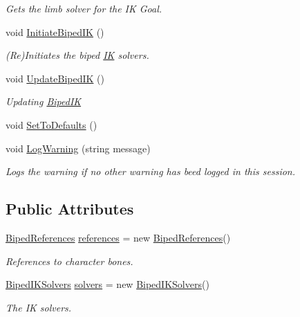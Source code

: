 \begin{DoxyCompactItemize}
\begin{DoxyCompactList}\small\item\em Gets the limb solver for the IK Goal. \end{DoxyCompactList}\item 
void \mbox{\hyperlink{class_root_motion_1_1_final_i_k_1_1_biped_i_k_ac507a1f7a39259bb1620b36534e0ffa2}{Initiate\+Biped\+IK}} ()
\begin{DoxyCompactList}\small\item\em (Re)Initiates the biped \mbox{\hyperlink{class_root_motion_1_1_final_i_k_1_1_i_k}{IK}} solvers. \end{DoxyCompactList}\item 
void \mbox{\hyperlink{class_root_motion_1_1_final_i_k_1_1_biped_i_k_a98cf2065a4b9994d94d6ac4c5a5437bd}{Update\+Biped\+IK}} ()
\begin{DoxyCompactList}\small\item\em Updating \mbox{\hyperlink{class_root_motion_1_1_final_i_k_1_1_biped_i_k}{Biped\+IK}} \end{DoxyCompactList}\item 
void \mbox{\hyperlink{class_root_motion_1_1_final_i_k_1_1_biped_i_k_a8a574c591fde96dd451f99a6784bd5d5}{Set\+To\+Defaults}} ()
\item 
void \mbox{\hyperlink{class_root_motion_1_1_final_i_k_1_1_biped_i_k_a3cf71da9ed6cce26b07391960d3b42f3}{Log\+Warning}} (string message)
\begin{DoxyCompactList}\small\item\em Logs the warning if no other warning has beed logged in this session. \end{DoxyCompactList}\end{DoxyCompactItemize}
\subsection*{Public Attributes}
\begin{DoxyCompactItemize}
\item 
\mbox{\hyperlink{class_root_motion_1_1_biped_references}{Biped\+References}} \mbox{\hyperlink{class_root_motion_1_1_final_i_k_1_1_biped_i_k_ac93bc8bdce80e6b8cbadf19f86881a69}{references}} = new \mbox{\hyperlink{class_root_motion_1_1_biped_references}{Biped\+References}}()
\begin{DoxyCompactList}\small\item\em References to character bones. \end{DoxyCompactList}\item 
\mbox{\hyperlink{class_root_motion_1_1_final_i_k_1_1_biped_i_k_solvers}{Biped\+I\+K\+Solvers}} \mbox{\hyperlink{class_root_motion_1_1_final_i_k_1_1_biped_i_k_aaa340fa0be202c7922423736dd274068}{solvers}} = new \mbox{\hyperlink{class_root_motion_1_1_final_i_k_1_1_biped_i_k_solvers}{Biped\+I\+K\+Solvers}}()
\begin{DoxyCompactList}\small\item\em The IK solvers. \end{DoxyCompactList}\end{DoxyCompactItemize}
